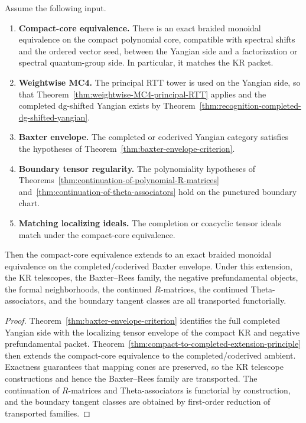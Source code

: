 \begin{theorem}
\ClaimStatusProvedHere
\label{thm:typeA-reduction-full-derived-DK-frontier}
Assume the following input.
\begin{enumerate}
 \item \textbf{Compact-core equivalence.}
 There is an exact braided monoidal equivalence on the compact
 polynomial core, compatible with spectral shifts and the ordered
 vector seed, between the Yangian side and a factorization or spectral
 quantum-group side. In particular, it matches the KR packet.
 \item \textbf{Weightwise MC4.}
 The principal RTT tower is used on the Yangian side, so that
 Theorem~\ref{thm:weightwise-MC4-principal-RTT} applies and the
 completed dg-shifted Yangian exists by
 Theorem~\ref{thm:recognition-completed-dg-shifted-yangian}.
 \item \textbf{Baxter envelope.}
 The completed or coderived Yangian category satisfies the hypotheses
 of Theorem~\ref{thm:baxter-envelope-criterion}.
 \item \textbf{Boundary tensor regularity.}
 The polynomiality hypotheses of
 Theorems~\ref{thm:continuation-of-polynomial-R-matrices}
 and~\ref{thm:continuation-of-theta-associators} hold on the punctured
 boundary chart.
 \item \textbf{Matching localizing ideals.}
 The completion or coacyclic tensor ideals match under the compact-core
 equivalence.
\end{enumerate}
Then the compact-core equivalence extends to an exact braided monoidal
equivalence on the completed/coderived Baxter envelope. Under this
extension, the KR telescopes, the Baxter--Rees family, the negative
prefundamental objects, the formal neighborhoods, the continued
$R$-matrices, the continued Theta-associators, and the boundary tangent
classes are all transported functorially.
\end{theorem}

\begin{proof}
Theorem~\ref{thm:baxter-envelope-criterion} identifies the full completed
Yangian side with the localizing tensor envelope of the compact KR and
negative prefundamental packet. Theorem~\ref{thm:compact-to-completed-extension-principle}
then extends the compact-core equivalence to the completed/coderived
ambient. Exactness guarantees that mapping cones are preserved, so the KR
telescope constructions and hence the Baxter--Rees family are transported.
The continuation of $R$-matrices and Theta-associators is functorial by
construction, and the boundary tangent classes are obtained by first-order
reduction of transported families.
\end{proof}

